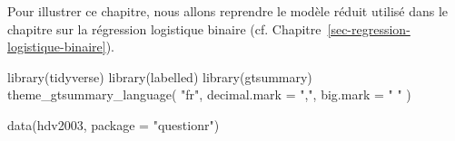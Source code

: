 \documentclass[
  letterpaper,
  DIV=11,
  numbers=noendperiod,
  oneside]{scrreprt}
\newenvironment{Shaded}{\begin{snugshade}}{\end{snugshade}}
\newcommand{\AttributeTok}[1]{\textcolor[rgb]{0.40,0.45,0.13}{#1}}
\newcommand{\FunctionTok}[1]{\textcolor[rgb]{0.28,0.35,0.67}{#1}}
\newcommand{\NormalTok}[1]{\textcolor[rgb]{0.00,0.23,0.31}{#1}}
\newcommand{\StringTok}[1]{\textcolor[rgb]{0.13,0.47,0.30}{#1}}
\begin{document}
Pour illustrer ce chapitre, nous allons reprendre le modèle réduit
utilisé dans le chapitre sur la régression logistique binaire (cf.
Chapitre~\ref{sec-regression-logistique-binaire}).

\begin{Shaded}
\begin{Highlighting}[]
\FunctionTok{library}\NormalTok{(tidyverse)}
\FunctionTok{library}\NormalTok{(labelled)}
\FunctionTok{library}\NormalTok{(gtsummary)}
\FunctionTok{theme\_gtsummary\_language}\NormalTok{(}
  \StringTok{"fr"}\NormalTok{,}
  \AttributeTok{decimal.mark =} \StringTok{","}\NormalTok{,}
  \AttributeTok{big.mark =} \StringTok{" "}
\NormalTok{)}

\FunctionTok{data}\NormalTok{(hdv2003, }\AttributeTok{package =} \StringTok{"questionr"}\NormalTok{)}


\end{Highlighting}
\end{Shaded}
\end{document}
